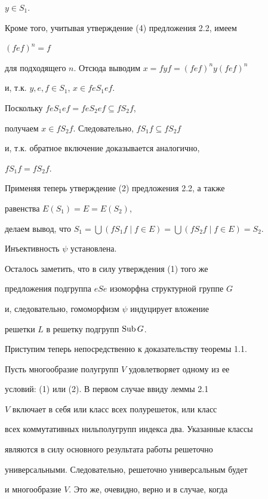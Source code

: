 \begin{pf}
$y \in S_1$.


Кроме того, учитывая утверждение (4) предложения 2.2, имеем


$(fef)^n = f$


для подходящего $n$. Отсюда выводим $x = fyf = (fef)^n y(fef)^n$


и, т.к. $y,e,f \in S_1$, $x \in feS_1ef$.


Поскольку $feS_1ef = feS_2ef \subseteq fS_2f$,


получаем $x \in fS_2f$. Следовательно, $fS_1f \subseteq


fS_2f$


и, т.к. обратное включение доказывается аналогично,


$fS_1f = fS_2f$.


Применяя теперь утверждение (2) предложения 2.2, а также


равенства $E(S_1) = E = E(S_2)$,


делаем вывод, что $S_1 = \bigcup (fS_1f \mid f \in E ) =


\bigcup (fS_2f \mid f \in E ) = S_{2}$.


Инъективность $\psi$ установлена.





Осталось заметить, что в силу утверждения (1) того же


предложения подгруппа $eSe$ изоморфна структурной группе $G$


и, следовательно, гомоморфизм $\psi$ индуцирует вложение


решетки $L$ в решетку подгрупп $\operatorname{Sub} G$.


\end{pf}





Приступим теперь непосредственно к доказательству теоремы 1.1.


Пусть многообразие полугрупп $V$ удовлетворяет одному из ее


условий: (1) или (2). В первом случае ввиду леммы 2.1


$V$ включает в себя или класс всех полурешеток, или класс


всех коммутативных нильполугрупп индекса два. Указанные классы


являются в силу основного результата работы \cite{Rep1} решеточно


универсальными. Следовательно, решеточно универсальным будет


и многообразие $V$. Это же, очевидно, верно и в случае, когда


